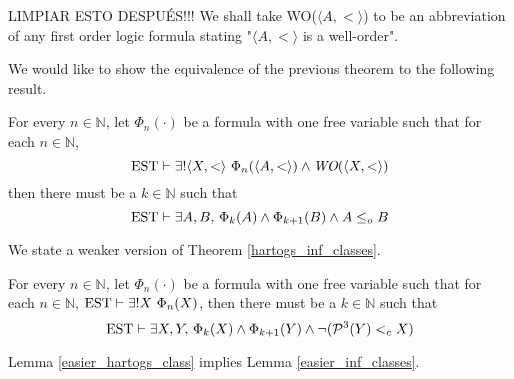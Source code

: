 \begin{notation}
	LIMPIAR ESTO DESPUÉS!!! We shall take WO($\langle A,<\rangle$) to be an abbreviation of any first order logic formula stating "$\langle A,<\rangle$ is a well-order".
\end{notation}

We would like to show the equivalence of the previous theorem to the following result.

\begin{lemma}
	\label{easier_hartogs_class}
	For every $n\in\mathbb{N}$, let $\Phi_n(\cdot)$ be a formula with one free variable such that for each $n\in\mathbb{N}$, 
	\[
		\operatorname{EST} \vdash \exists! \langle X, < \rangle \ \Phi_n ( \langle A,<\rangle) \land 
		\emph{WO}(\langle X, < \rangle)
	\]
	then there must be a $k \in \mathbb{N}$ such that 
	\[
		\operatorname{EST} \vdash \exists A,B, \, \Phi_k (A) \land \Phi_{k+1} (B) \land A \leq_o B
	\]
\end{lemma}

We state a weaker version of Theorem \ref{hartogs_inf_classes}.

\begin{lemma}
	\label{easier_inf_classes}
	For every $n\in\mathbb{N}$, let $\Phi_n(\cdot)$ be a formula with one free variable such that for each $n\in\mathbb{N}$, $\operatorname{EST} \vdash \exists! X \ \Phi_n (X)$, then there must be a $k \in \mathbb{N}$ such that 
	\[
		\operatorname{EST} \vdash \exists X,Y ,\, \Phi_k (X) \land \Phi_{k+1} (Y) \land \neg(\mathcal{P}^{3}(Y) <_c X)
	\]
\end{lemma}

\begin{theorem}
	Lemma \ref{easier_hartogs_class} implies Lemma \ref{easier_inf_classes}.
\end{theorem}

